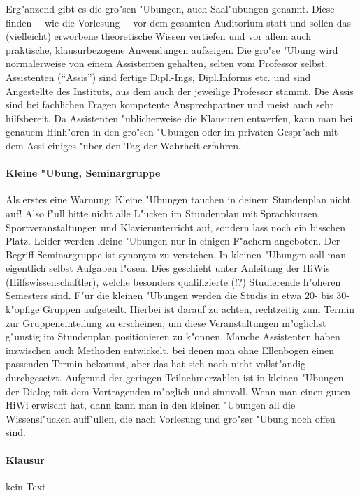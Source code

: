 \begin{multicols}{2}
Erg"anzend gibt es die gro"sen "Ubungen, auch Saal"ubungen genannt. Diese
finden~-- wie die Vorlesung~-- vor dem gesamten Auditorium statt und sollen das
(vielleicht) erworbene theoretische Wissen vertiefen und vor allem auch
praktische, klausurbezogene Anwendungen aufzeigen. Die gro"se "Ubung wird
normalerweise von einem Assistenten gehalten, selten vom Professor selbst.
Assistenten ("`Assis"') sind fertige Dipl.-Ings, Dipl.Informs etc. und sind
Angestellte des Instituts, aus dem auch der jeweilige Professor stammt. Die
Assis sind bei fachlichen Fragen kompetente Ansprechpartner und meist auch sehr
hilfsbereit. Da Assistenten "ublicherweise die Klausuren entwerfen, kann man
bei genauem Hinh"oren in den gro"sen "Ubungen oder im privaten Gespr"ach mit
dem Assi einiges "uber den Tag der Wahrheit erfahren.


\paragraph*{Kleine "Ubung, Seminargruppe}

Als erstes eine Warnung: Kleine "Ubungen tauchen in deinem Stundenplan nicht auf!
Also f"ull bitte nicht alle L"ucken im
Stundenplan mit Sprachkursen, Sportveranstaltungen und Klavierunterricht auf,
sondern lass noch ein bisschen Platz. Leider werden kleine "Ubungen nur in
einigen F"achern angeboten. Der Begriff Seminargruppe ist synonym zu verstehen.
In kleinen "Ubungen soll man eigentlich selbst Aufgaben l"osen. Dies geschieht
unter Anleitung der HiWis (Hilfswissenschaftler), welche besonders qualifizierte
(!?) Studierende h"oheren Semesters sind. F"ur die kleinen "Ubungen werden die
Studis in etwa 20- bis 30-k"opfige Gruppen aufgeteilt. Hierbei ist darauf zu
achten, rechtzeitig zum Termin zur Gruppeneinteilung zu erscheinen, um diese
Veranstaltungen m"oglichst g"unstig im Stundenplan positionieren zu k"onnen.
Manche Assistenten haben inzwischen auch Methoden entwickelt, bei denen man
ohne Ellenbogen einen passenden Termin bekommt, aber das hat sich noch nicht
vollst"andig durchgesetzt. Aufgrund der geringen Teilnehmerzahlen ist in
kleinen "Ubungen der Dialog mit dem Vortragenden m"oglich und sinnvoll. Wenn
man einen guten HiWi erwischt hat, dann kann man in den kleinen "Ubungen all
die Wissensl"ucken auff"ullen, die nach Vorlesung und gro"ser "Ubung noch offen
sind.

\paragraph*{Klausur}
kein Text


\end{multicols}
